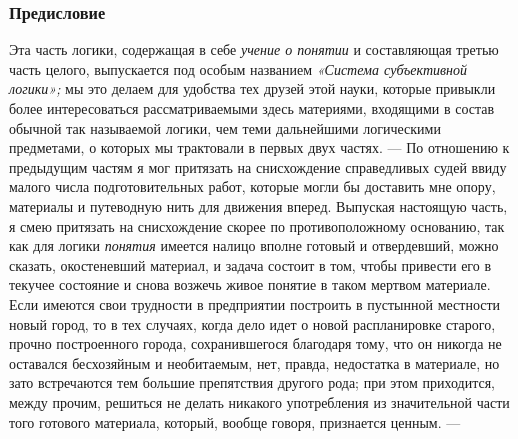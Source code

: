 \documentclass[twoside]{article}
\begin{document}
\subsubsection[Предисловие]{Предисловие}
Эта часть логики, содержащая в себе {\em учение о понятии} и составляющая 
третью часть целого, выпускается под особым названием {\em «Система 
субъективной логики»;} мы это делаем для удобства тех друзей этой науки, 
которые привыкли более интересоваться рассматриваемыми здесь материями, 
входящими в состав обычной так называемой логики, чем теми дальнейшими 
логическими предметами, о которых мы трактовали в первых двух частях. —
По отношению к предыдущим частям я мог притязать на снисхождение 
справедливых судей ввиду малого числа подготовительных работ, которые могли 
бы доставить мне опору, материалы и путеводную нить для
движения вперед. Выпуская настоящую часть, я смею притязать на снисхождение
скорее по противоположному основанию, так как для логики
{\em понятия} имеется
налицо вполне готовый и отвердевший, можно сказать, окостеневший материал,
и задача состоит в том, чтобы привести его в текучее состояние и снова
возжечь живое понятие в таком мертвом материале. Если имеются свои
трудности в предприятии построить в пустынной местности новый город, то в
тех случаях, когда дело идет о новой распланировке старого, прочно
построенного города, сохранившегося благодаря тому, что он никогда не
оставался бесхозяйным и необитаемым, нет, правда, недостатка в материале,
но зато встречаются тем большие препятствия другого рода; при этом
приходится, между прочим, решиться не делать никакого употребления из
значительной части того готового материала, который, вообще говоря,
признается ценным. —
\end{document}

